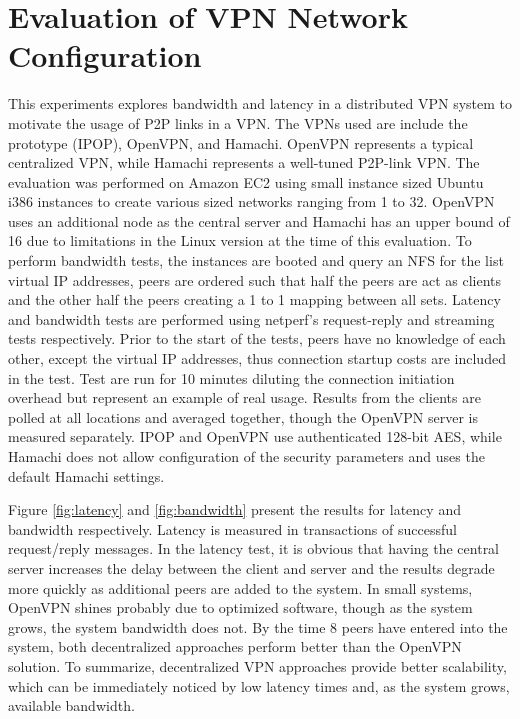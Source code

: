 \section{Evaluation of VPN Network Configuration}
This experiments explores bandwidth and latency in a distributed VPN system to
motivate the usage of P2P links in a VPN.  The VPNs used are include the
prototype (IPOP), OpenVPN, and Hamachi.  OpenVPN represents a typical
centralized VPN, while Hamachi represents a well-tuned P2P-link VPN.  The
evaluation was performed on Amazon EC2 using small instance sized
Ubuntu i386 instances to create various sized networks ranging from 1 to 32.
OpenVPN uses an additional node as the central server and Hamachi has an upper
bound of 16 due to limitations in the Linux version at the time of this
evaluation.  To perform bandwidth tests, the instances are booted and query an
NFS for the list virtual IP addresses, peers are ordered such that half the
peers are act as clients and the other half the peers creating a 1 to 1 mapping
between all sets.  Latency and bandwidth tests are performed using netperf's
request-reply and streaming tests respectively.  Prior to the start of the
tests, peers have no knowledge of each other, except the virtual IP addresses,
thus connection startup costs are included in the test.  Test are run for 10
minutes diluting the connection initiation overhead but represent an example of
real usage.  Results from the clients are polled at all locations and averaged
together, though the OpenVPN server is measured separately.  IPOP and OpenVPN
use authenticated 128-bit AES, while Hamachi does not allow configuration of
the security parameters and uses the default Hamachi settings.

Figure \ref{fig:latency} and \ref{fig:bandwidth} present the results for latency
and bandwidth respectively.  Latency is measured in transactions of successful
request/reply messages.  In the latency test, it is obvious that having the
central server increases the delay between the client and server and the results
degrade more quickly as additional peers are added to the system.  In small
systems, OpenVPN shines probably due to optimized software, though as the system
grows, the system bandwidth does not.  By the time 8 peers have entered into
the system, both decentralized approaches perform better than the OpenVPN
solution.  To summarize, decentralized VPN approaches provide better
scalability, which can be immediately noticed by low latency times and, as the
system grows, available bandwidth.

